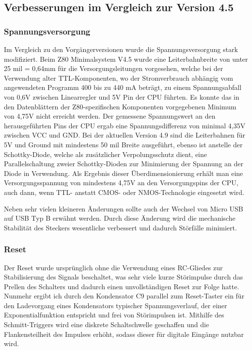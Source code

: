 \subsection{Verbesserungen im Vergleich zur Version 4.5}
\subsubsection{Spannungsversorgung}
Im Vergleich zu den Vorgängerversionen wurde die Spannungsversorgung stark modifiziert. Beim Z80 Minimalsystem V4.5 wurde eine Leiterbahnbreite von unter 25 mil = 0,64mm für die Versorgungsleitungen vorgesehen, welche bei der Verwendung alter TTL-Komponenten, wo der Stromverbrauch abhängig vom angewendeten Programm 400 bis zu 440 mA beträgt, zu einem Spannungsabfall von 0,6V zwischen Linearregler und 5V Pin der CPU führten. Es konnte das in den Datenblättern der Z80-spezifischen Komponenten vorgegebenen Minimum von 4,75V nicht erreicht werden. Der gemessene Spannungswert an den herausgeführten Pins der CPU ergab eine Spannungsdifferenz von minimal 4,35V zwischen VCC und GND. Bei der aktuellen Version 4.9 sind die Leiterbahnen für 5V und Ground mit mindestens 50 mil Breite ausgeführt, ebenso ist anstelle der Schottky-Diode, welche als zusätzlicher Verpolungsschutz dient, eine Parallelschaltung zweier Schottky-Dioden zur Minimierung der Spannung an der Diode in Verwendung. Als Ergebnis dieser Überdimensionierung erhält man eine Versorgungsspannung von mindestens 4,75V an den Versorgungspins der CPU, auch dann, wenn TTL- anstatt CMOS- oder NMOS-Technologie eingesetzt wird.

Neben sehr vielen kleineren Änderungen sollte auch der Wechsel von Micro USB auf USB Typ B erwähnt werden. Durch diese Änderung wird die mechanische Stabilität des Steckers wesentliche verbessert und dadurch Störfälle minimiert.

\subsubsection{Reset}
Der Reset wurde ursprünglich ohne die Verwendung eines RC-Gliedes zur Stabilisierung des Signals beschaltet, was sehr viele kurze Störimpulse durch das Prellen des Schalters und dadurch einen unvollständigen Reset zur Folge hatte. Nunmehr ergibt ich durch den Kondensator C9 parallel zum Reset-Taster ein für den Ladevorgang eines Kondensators typischer Spannungsverlauf, der einer Exponentialfunktion entspricht und frei von Störimpulsen ist. Mithilfe des Schmitt-Triggers wird eine diskrete Schaltschwelle geschaffen und die Flankensteilheit des Impulses erhöht, sodass dieser für digitale Eingänge nutzbar wird.

